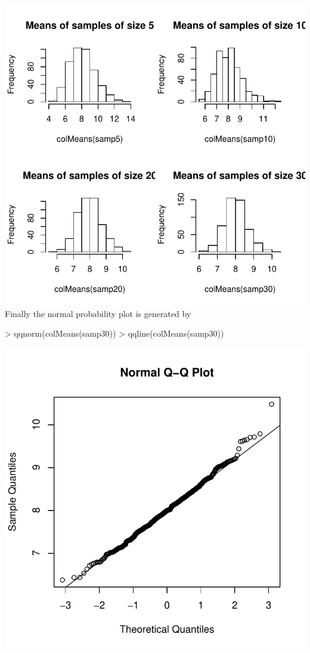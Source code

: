 \documentclass{book}
\begin{document}
\includegraphics{Devore6-xmp0523b}
Finally the normal probability plot is generated by
\begin{center}
\begin{Schunk}
\begin{Sinput}
> qqnorm(colMeans(samp30))
> qqline(colMeans(samp30))
\end{Sinput}
\end{Schunk}
\includegraphics{Devore6-xmp0523c}
\end{center}
\end{document}
